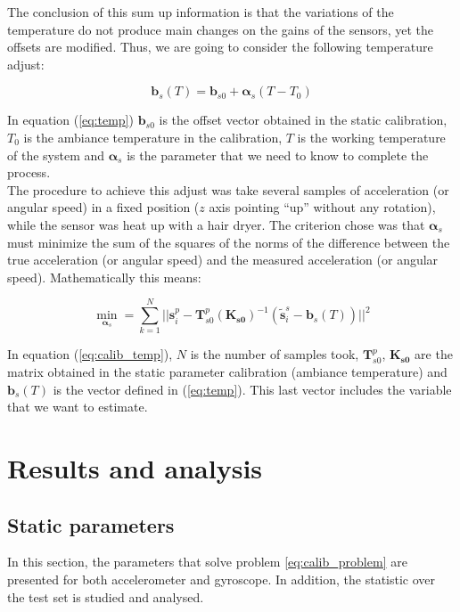 \documentclass[conference]{IEEEtran}
\newcommand{\refp}[1]{(\ref{#1})}
\begin{document}
The conclusion of this sum up information is that the variations of the temperature do not produce main changes on the gains of the sensors, yet the offsets are modified. Thus, we are going to consider the following temperature adjust:

\begin{equation}
\mathbf{b}_s(T) = \mathbf{b}_{s0} + \boldsymbol{\alpha}_s (T-T_0)
\label{eq:temp}
\end{equation}

In equation \refp{eq:temp} $\mathbf{b}_{s0}$ is the offset vector obtained in the static calibration, $T_0$ is the ambiance temperature in the calibration, $T$ is the working temperature of the system and $\boldsymbol{\alpha}_s$ is the parameter that we need to know to complete the process.\\ 

The procedure to achieve this adjust was take several samples of acceleration (or angular speed) in a fixed position ($z$ axis pointing ``up'' without any rotation), while the sensor was heat up with a hair dryer. The criterion chose was that $\boldsymbol{\alpha}_s$ must minimize the sum of the squares of the norms of the difference between the true acceleration (or angular speed) and the measured acceleration (or angular speed). Mathematically this means:

\begin{equation}
\min_{\boldsymbol{\alpha}_s} = \sum_{k=1}^N ||\mathbf{s}_i^p - \mathbf{T}_{s0}^p(\mathbf{K_{s0}})^{-1}(\tilde{\mathbf{s}}_i^s-\mathbf{b}_s(T))||^2 
\label{eq:calib_temp}
\end{equation}

In equation \refp{eq:calib_temp}, $N$ is the number of samples took, $\mathbf{T}_{s0}^p$, $\mathbf{K_{s0}}$ are the matrix obtained in the static parameter calibration (ambiance temperature) and $\mathbf{b}_s(T)$ is the vector defined in \refp{eq:temp}. This last vector includes the variable that we want to estimate.\\

\section{Results and analysis}
\subsection{Static parameters}
In this section, the parameters that solve problem \ref{eq:calib_problem} are presented for both accelerometer and gyroscope. In addition, the statistic over the test set is studied and analysed. \\
\end{document}
